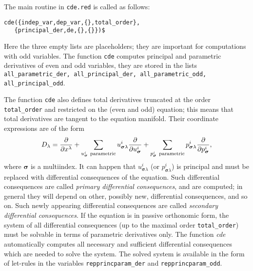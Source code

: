 The main routine in \texttt{cde.red} is called as follows:
\begin{verbatim}
cde({indep_var,dep_var,{},total_order},
   {principal_der,de,{},{}})$
\end{verbatim}
Here the three empty lists are placeholders; they are important for
computations with odd variables. The function \texttt{cde}
computes principal and parametric derivatives of even and odd variables, they
are stored in the lists \texttt{all\_parametric\_der, all\_principal\_der, 
all\_parametric\_odd, all\_principal\_odd}.

The function \texttt{cde} also defines total derivatives truncated at the order
\texttt{total\_order} and restricted on the (even and odd) equation; this means
that total derivatives are tangent to the equation manifold. Their coordinate
expressions are of the form
\begin{equation}
  D_\lambda=\pd{}{x^\lambda}+\sum_{u^i_{\boldsymbol{\sigma}}\
    \text{parametric}}u^i_{\boldsymbol{\sigma}\lambda}\pd{}{u^i_{\boldsymbol{\sigma}}}
  + \sum_{p^i_{\boldsymbol{\sigma}}\
    \text{parametric}}p^i_{\boldsymbol{\sigma}\lambda}\pd{}{p^i_{\boldsymbol{\sigma}}},
\end{equation}
where $\boldsymbol{\sigma}$ is a multiindex.  It can happen that
$u^i_{\boldsymbol{\sigma}\lambda}$ (or $p^i_{\boldsymbol{\sigma}\lambda}$) is
principal and must be replaced with differential consequences of the equation.
Such differential consequences are called \emph{primary differential
  consequences}, and are computed; in general they will depend on other,
possibly new, differential consequences, and so on. Such newly appearing
differential consequences are called \emph{secondary differential
  consequences}. If the equation is in passive orthonomic form, the system of
all differential consequences (up to the maximal order \texttt{total\_order})
must be solvable in terms of parametric derivatives only. The function
\emph{cde} automatically computes all necessary and sufficient differential
consequences which are needed to solve the system. The solved system is
available in the form of \REDUCE let-rules in the variables
\texttt{repprincparam\_der} and \texttt{repprincparam\_odd}.

